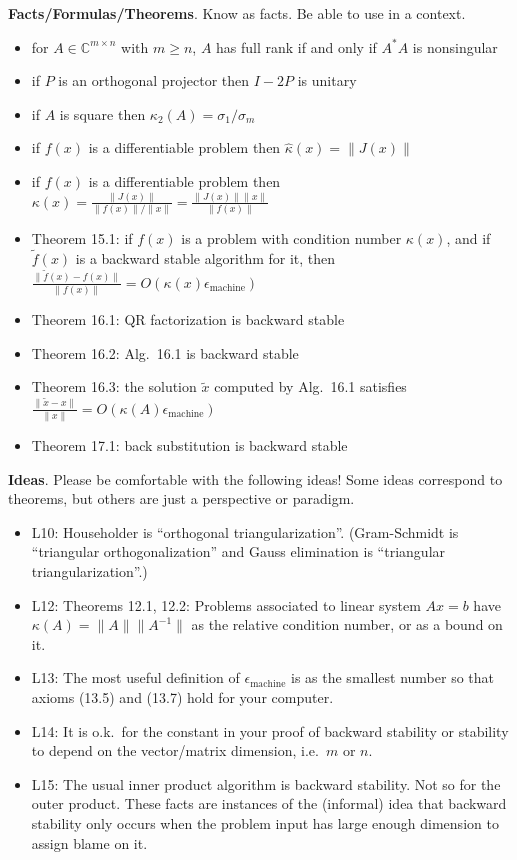 \documentclass[11pt]{amsart}
\newcommand{\normalspacing}{\renewcommand{\baselinestretch}{1.1}\tiny\normalsize}
\newcommand{\bigspacing}{\renewcommand{\baselinestretch}{1.21}\tiny\normalsize}
\newcommand{\CC}{{\mathbb{C}}}
\newcommand{\eps}{\epsilon}
\newcommand{\emach}{\eps_{\text{machine}}}
\newcommand{\ds}{\displaystyle}
\begin{document}
\clearpage\newpage
\noindent \textbf{Facts/Formulas/Theorems}.  Know as facts.  Be able to use in a context.
\begin{itemize}
\item for $A\in \CC^{m\times n}$ with $m\ge n$, $A$ has full rank if and only if $A^* A$ is nonsingular
\item if $P$ is an orthogonal projector then $I-2P$ is unitary
\item if $A$ is square then $\kappa_2(A)=\sigma_1/\sigma_m$
\item if $f(x)$ is a differentiable problem then $\hat\kappa(x) = \|J(x)\|$
\item if $f(x)$ is a differentiable problem then $\ds \kappa(x) = \frac{\|J(x)\|}{\|f(x)\|/\|x\|} = \frac{\|J(x)\|\|x\|}{\|f(x)\|}$
\item Theorem 15.1: if $f(x)$ is a problem with condition number $\kappa(x)$, and if $\tilde f(x)$ is a backward stable algorithm for it, then $\ds \frac{\|\tilde f(x) - f(x)\|}{\|f(x)\|} = O(\kappa(x) \emach)$

\smallskip
\item Theorem 16.1: QR factorization is backward stable
\item Theorem 16.2: Alg.~16.1 is backward stable
\item Theorem 16.3: the solution $\tilde x$ computed by Alg.~16.1 satisfies $\ds \frac{\|\tilde x - x\|}{\|x\|} = O(\kappa(A) \emach)$
\item Theorem 17.1: back substitution is backward stable
\end{itemize}

\normalspacing

\bigskip\noindent \textbf{Ideas}.  Please be comfortable with the following ideas!  Some ideas correspond to theorems, but others are just a perspective or paradigm.

\bigspacing
\begin{itemize}
\item L10: Householder is ``orthogonal triangularization''.  (Gram-Schmidt is ``triangular orthogonalization'' and Gauss elimination is ``triangular triangularization''.)
\item L12: Theorems 12.1, 12.2: Problems associated to linear system $Ax=b$ have $\kappa(A)=\|A\|\|A^{-1}\|$ as the relative condition number, or as a bound on it.
\item L13: The most useful definition of $\emach$ is as the smallest number so that axioms (13.5) and (13.7) hold for your computer.
\item L14: It is o.k.~for the constant in your proof of backward stability or stability to depend on the vector/matrix dimension, i.e.~$m$ or $n$.
\item L15: The usual inner product algorithm is backward stability.  Not so for the outer product.  These facts are instances of the (informal) idea that backward stability only occurs when the problem input has large enough dimension to assign blame on it.
\end{itemize}
\end{document}
